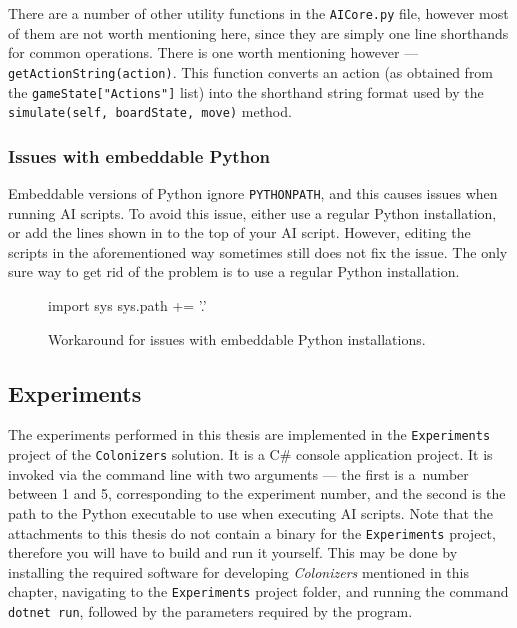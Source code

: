There are a number of other utility functions in the \texttt{AICore.py} file,
however most of them are not worth mentioning here, since they are simply one line
shorthands for common operations. There is one worth mentioning however ---
\texttt{getActionString(action)}. This function converts an action (as obtained from
the \texttt{gameState["Actions"]} list) into the shorthand string format
used by the \texttt{simulate(self, boardState, move)} method.

\subsubsection{Issues with embeddable Python}
\label{dd:embedpy}

Embeddable versions of Python ignore \texttt{PYTHONPATH}, and this causes issues
when running AI scripts. To avoid this issue, either use a regular Python installation,
or add the lines shown in  to the top of your AI script.
However, editing the scripts in the aforementioned way sometimes still does not fix the issue.
The only sure way to get rid of the problem is to use a regular Python installation.

\begin{figure}[ht]
\begin{code}[commandchars=\\\{\},codes={\catcode`\$=3\catcode`\^=7\catcode`\_=8}]
import sys
sys.path += '.'
\end{code}
\caption{Workaround for issues with embeddable Python installations.}
\label{dd:embedex}
\end{figure}

\subsection{Experiments}
\label{chap:experimentdocs}

The experiments performed in this thesis are implemented in the \texttt{Experiments}
project of the \texttt{Colonizers} solution. It is a C\# console application project.
It is invoked via the command line with two arguments --- the first is a~number
between 1 and 5, corresponding to the experiment number, and the second
is the path to the Python executable to use when executing AI scripts.
Note that the attachments to this thesis do not contain a binary
for the \texttt{Experiments} project, therefore you will have to build and
run it yourself. This may be done by installing the required software for
developing \emph{Colonizers} mentioned in this chapter, navigating to the
\texttt{Experiments} project folder, and running the command \texttt{dotnet run},
followed by the parameters required by the program.


